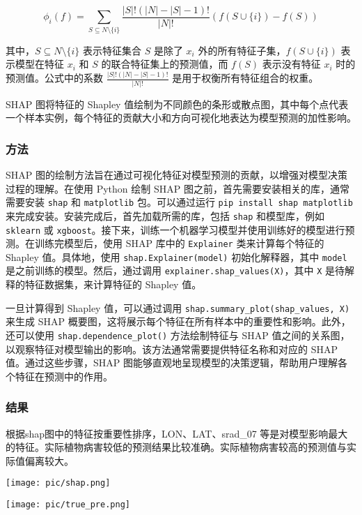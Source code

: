 \documentclass{article}
\begin{document}
\[
\phi_i(f) = \sum_{S \subseteq N \setminus \{i\}} \frac{|S|! (|N| - |S| - 1)!}{|N|!} \left( f(S \cup \{i\}) - f(S) \right)
\]

其中，\( S \subseteq N \setminus \{i\} \) 表示特征集合 \( S \) 是除了 \( x_i \) 外的所有特征子集，\( f(S \cup \{i\}) \) 表示模型在特征 \( x_i \) 和 \( S \) 的联合特征集上的预测值，而 \( f(S) \) 表示没有特征 \( x_i \) 时的预测值。公式中的系数 \( \frac{|S|! (|N| - |S| - 1)!}{|N|!} \) 是用于权衡所有特征组合的权重。

SHAP 图将特征的 Shapley 值绘制为不同颜色的条形或散点图，其中每个点代表一个样本实例，每个特征的贡献大小和方向可视化地表达为模型预测的加性影响。
\subsubsection{方法}
SHAP 图的绘制方法旨在通过可视化特征对模型预测的贡献，以增强对模型决策过程的理解。在使用 Python 绘制 SHAP 图之前，首先需要安装相关的库，通常需要安装 \texttt{shap} 和 \texttt{matplotlib} 包。可以通过运行 \texttt{pip install shap matplotlib} 来完成安装。安装完成后，首先加载所需的库，包括 \texttt{shap} 和模型库，例如 \texttt{sklearn} 或 \texttt{xgboost}。接下来，训练一个机器学习模型并使用训练好的模型进行预测。在训练完模型后，使用 SHAP 库中的 \texttt{Explainer} 类来计算每个特征的 Shapley 值。具体地，使用 \texttt{shap.Explainer(model)} 初始化解释器，其中 \texttt{model} 是之前训练的模型。然后，通过调用 \texttt{explainer.shap\_values(X)}，其中 \texttt{X} 是待解释的特征数据集，来计算特征的 Shapley 值。

一旦计算得到 Shapley 值，可以通过调用 \texttt{shap.summary\_plot(shap\_values, X)} 来生成 SHAP 概要图，这将展示每个特征在所有样本中的重要性和影响。此外，还可以使用 \texttt{shap.dependence\_plot()} 方法绘制特征与 SHAP 值之间的关系图，以观察特征对模型输出的影响。该方法通常需要提供特征名称和对应的 SHAP 值。通过这些步骤，SHAP 图能够直观地呈现模型的决策逻辑，帮助用户理解各个特征在预测中的作用。


\subsubsection{结果}
根据shap图中的特征按重要性排序，LON、LAT、srad\_07 等是对模型影响最大的特征。实际植物病害较低的预测结果比较准确。实际植物病害较高的预测值与实际值偏离较大。
\par
\texttt{[image: pic/shap.png]} %
\par
\texttt{[image: pic/true\_pre.png]} %
\end{document}
